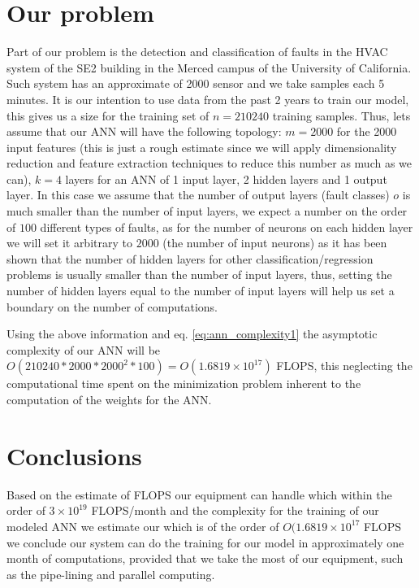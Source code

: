 \section{Our problem}

Part of our problem is the detection and classification of faults in the HVAC system of the SE2 building in the Merced campus of the University of California. Such system has an approximate of 2000 sensor and we take samples each 5 minutes. It is our intention to use data from the past 2 years to train our model, this gives us a size for the training set of $n = 210240$ training samples. Thus, lets assume that our ANN will have the following topology: $m = 2000$ for the 2000 input features (this is just a rough estimate since we will apply dimensionality reduction and feature extraction techniques to reduce this number as much as we can), $k = 4$ layers for an ANN of 1 input layer, 2 hidden layers and 1 output layer. In this case we assume that the number of output layers (fault classes) $o$ is much smaller than the number of input layers, we expect a number on the order of $100$ different types of faults, as for the number of neurons on each hidden layer we will set it arbitrary to $2000$ (the number of input neurons) as it has been shown that the number of hidden layers for other classification/regression problems is usually smaller than the number of input layers, thus, setting the number of hidden layers equal to the number of input layers will help us set a boundary on the number of computations.

Using the above information and eq. \eqref{eq:ann_complexity1} the asymptotic complexity of our ANN will be $O(210240 * 2000 * 2000^2 * 100) = O(1.6819 \times 10^{17})$ FLOPS, this neglecting the computational time spent on the minimization problem inherent to the computation of the weights for the ANN.

\section{Conclusions}

Based on the estimate of FLOPS our equipment can handle which within the order of $3 \times 10^{19}$ FLOPS/month and the complexity for the training of our modeled ANN we estimate our which is of the order of $O(1.6819 \times 10^{17}$ FLOPS we conclude our system can do the training for our model in approximately one month of computations, provided that we take the most of our equipment, such as the pipe-lining and parallel computing.
